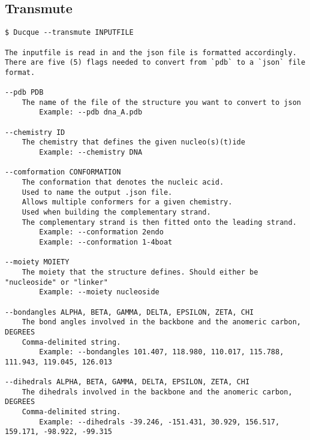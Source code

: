 \pagebreak
\subsection{Transmute}


\small
\begin{verbatim}
$ Ducque --transmute INPUTFILE

The inputfile is read in and the json file is formatted accordingly.
There are five (5) flags needed to convert from `pdb` to a `json` file format.

--pdb PDB
    The name of the file of the structure you want to convert to json
        Example: --pdb dna_A.pdb

--chemistry ID
    The chemistry that defines the given nucleo(s)(t)ide
        Example: --chemistry DNA

--comformation CONFORMATION
    The conformation that denotes the nucleic acid.
    Used to name the output .json file.
    Allows multiple conformers for a given chemistry.
    Used when building the complementary strand.
    The complementary strand is then fitted onto the leading strand.
        Example: --conformation 2endo
        Example: --conformation 1-4boat

--moiety MOIETY
    The moiety that the structure defines. Should either be "nucleoside" or "linker"
        Example: --moiety nucleoside

--bondangles ALPHA, BETA, GAMMA, DELTA, EPSILON, ZETA, CHI
    The bond angles involved in the backbone and the anomeric carbon, DEGREES
    Comma-delimited string.
        Example: --bondangles 101.407, 118.980, 110.017, 115.788, 111.943, 119.045, 126.013

--dihedrals ALPHA, BETA, GAMMA, DELTA, EPSILON, ZETA, CHI
    The dihedrals involved in the backbone and the anomeric carbon, DEGREES
    Comma-delimited string.
        Example: --dihedrals -39.246, -151.431, 30.929, 156.517, 159.171, -98.922, -99.315
\end{verbatim}
\normalsize

